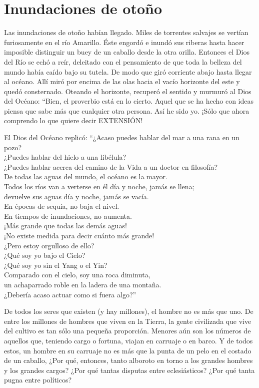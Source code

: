 \documentclass[hidelinks]{memoir}
\begin{document}
	\chapter*{Inundaciones de otoño}
	
	Las inundaciones de otoño habían llegado. Miles de torrentes salvajes se
	vertían furiosamente en el río Amarillo. Éste engordó e inundó sus
	riberas hasta hacer imposible distinguir un buey de un caballo desde la
	otra orilla. Entonces el Dios del Río se echó a reír, deleitado con el
	pensamiento de que toda la belleza del mundo había caído bajo su tutela.
	De modo que giró corriente abajo hasta llegar al océano. Allí miró por
	encima de las olas hacia el vacío horizonte del este y quedó
	consternado. Oteando el horizonte, recuperó el sentido y murmuró al Dios
	del Océano: ``Bien, el proverbio está en lo cierto. Aquel que se ha
	hecho con ideas piensa que sabe más que cualquier otra persona. Así he
	sido yo. ¡Sólo que ahora comprendo lo que quiere decir EXTENSIÓN!
	
	El Dios del Océano replicó: ``¿Acaso puedes hablar del mar a una rana en
	un pozo?\\
	¿Puedes hablar del hielo a una libélula?\\
	¿Puedes hablar acerca del camino de la Vida a un doctor en filosofía?\\
	De todas las aguas del mundo, el océano es la mayor.\\
	Todos los ríos van a verterse en él día y noche, jamás se llena;\\
	devuelve sus aguas día y noche, jamás se vacía.\\
	En épocas de sequía, no baja el nivel.\\
	En tiempos de inundaciones, no aumenta.\\
	¡Más grande que todas las demás aguas!\\
	¡No existe medida para decir cuánto más grande!\\
	¿Pero estoy orgulloso de ello?\\
	¿Qué soy yo bajo el Cielo?\\
	¿Qué soy yo sin el Yang o el Yin?\\
	Comparado con el cielo, soy una roca diminuta,\\
	un achaparrado roble en la ladera de una montaña.\\
	¿Debería acaso actuar como si fuera algo?''
	
	De todos los seres que existen (y hay millones), el hombre no es más que
	uno. De entre los millones de hombres que viven en la Tierra, la gente
	civilizada que vive del cultivo es tan sólo una pequeña proporción.
	Menores aún son los números de aquellos que, teniendo cargo o fortuna,
	viajan en carruaje o en barco. Y de todos estos, un hombre en su
	carruaje no es más que la punta de un pelo en el costado de un caballo,
	¿Por qué, entonces, tanto alboroto en torno a los grandes hombres y los
	grandes cargos? ¿Por qué tantas disputas entre eclesiásticos? ¿Por qué
	tanta pugna entre políticos?
	
\end{document}
